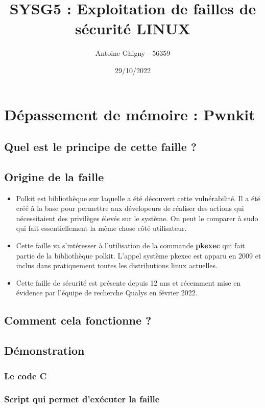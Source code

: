 \documentclass[a4paper, 12pt]{article}
\title{SYSG5 : Exploitation de failles de sécurité LINUX}
\author{Antoine Ghigny - 56359}          \let\Author\@author
\date{29/10/2022}           \let\Date\@date
\begin{document}
\maketitle 

   \tableofcontents

   \section{Dépassement de mémoire : Pwnkit}
   		\subsection{Quel est le principe de cette faille ?}
   		
		\subsection{Origine de la faille}   		
   		\begin{itemize}
			\item 	Polkit est bibliothèque sur laquelle a été découvert cette vulnérabilité. Il a été créé à la base pour permettre aux dévelopeurs de réaliser des actions qui nécessitaient des privilèges élevés sur le système. On peut le comparer à sudo qui fait essentiellement la même chose côté utilisateur.
   			\item Cette faille va s'intéresser à l'utilisation de la commande \textbf{pkexec} qui fait partie de la bibliothèque polkit. L'appel système pkexec est apparu en 2009 et inclus dans pratiquement toutes les distributions linux actuelles.
   			\item Cette faille de sécurité est présente depuis 12 ans et récemment mise en évidence par l'équipe de recherche Qualys en février 2022. \cite{qualys}
   		\end{itemize}
   		\subsection{Comment cela fonctionne ?}
   		
   		\subsection{Démonstration}
			\subsubsection{Le code C}   		
			
			\subsubsection{Script qui permet d'exécuter la faille}   	
			
\end{document}
